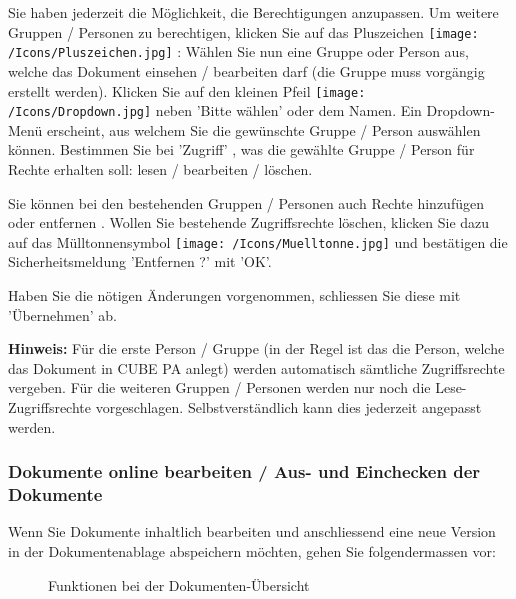 Sie haben jederzeit die Möglichkeit, die Berechtigungen anzupassen. Um weitere Gruppen / Personen zu berechtigen, klicken Sie auf das Pluszeichen \texttt{[image: /Icons/Pluszeichen.jpg]} : Wählen Sie nun eine Gruppe oder Person aus, welche das Dokument einsehen / bearbeiten darf (die Gruppe muss vorgängig erstellt werden). Klicken Sie auf den kleinen Pfeil \texttt{[image: /Icons/Dropdown.jpg]} neben 'Bitte wählen' oder dem Namen. Ein Dropdown-Menü erscheint, aus welchem Sie die gewünschte Gruppe / Person auswählen können. Bestimmen Sie bei 'Zugriff' , was die gewählte Gruppe / Person für Rechte erhalten soll: lesen / bearbeiten / löschen.

\vspace{\baselineskip}

Sie können bei den bestehenden Gruppen / Personen auch Rechte hinzufügen oder entfernen . Wollen Sie bestehende Zugriffsrechte löschen, klicken Sie dazu auf das Mülltonnensymbol \texttt{[image: /Icons/Muelltonne.jpg]}  und bestätigen die Sicherheitsmeldung 'Entfernen ?' mit 'OK'.  \newline

Haben Sie die nötigen Änderungen vorgenommen, schliessen Sie diese mit 'Übernehmen' ab. 

\vspace{\baselineskip}

\textbf{Hinweis:} Für die erste Person / Gruppe (in der Regel ist das die Person, welche das Dokument in CUBE PA anlegt) werden automatisch sämtliche Zugriffsrechte vergeben. Für die weiteren Gruppen / Personen werden nur noch die Lese-Zugriffsrechte vorgeschlagen. Selbstverständlich kann dies jederzeit angepasst werden.


\subsubsection{Dokumente online bearbeiten / Aus- und Einchecken der Dokumente}
\label{bkm:Ref442780171}\label{bkm:Ref442776572}

Wenn Sie Dokumente inhaltlich bearbeiten und anschliessend eine neue Version in der Dokumentenablage abspeichern möchten, gehen Sie folgendermassen vor:

\begin{figure}[H]
\caption{Funktionen bei der Dokumenten-Übersicht}
\end{figure}

